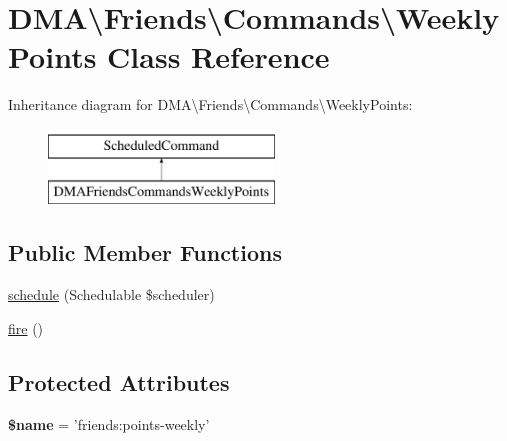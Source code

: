 \hypertarget{classDMA_1_1Friends_1_1Commands_1_1WeeklyPoints}{\section{D\+M\+A\textbackslash{}Friends\textbackslash{}Commands\textbackslash{}Weekly\+Points Class Reference}
\label{classDMA_1_1Friends_1_1Commands_1_1WeeklyPoints}
}
Inheritance diagram for D\+M\+A\textbackslash{}Friends\textbackslash{}Commands\textbackslash{}Weekly\+Points\+:\begin{figure}[H]
\begin{center}
\leavevmode
\includegraphics[height=2.000000cm]{d5/d03/classDMA_1_1Friends_1_1Commands_1_1WeeklyPoints}
\end{center}
\end{figure}
\subsection*{Public Member Functions}
\begin{DoxyCompactItemize}
\item 
\hyperlink{classDMA_1_1Friends_1_1Commands_1_1WeeklyPoints_a3610e0fd1a7e2e91dd70a05bfb7f94e8}{schedule} (Schedulable \$scheduler)
\item 
\hyperlink{classDMA_1_1Friends_1_1Commands_1_1WeeklyPoints_a3fb80cfeb37ba525e9b24e7362e35daf}{fire} ()
\end{DoxyCompactItemize}
\subsection*{Protected Attributes}
\begin{DoxyCompactItemize}
\item 
\hypertarget{classDMA_1_1Friends_1_1Commands_1_1WeeklyPoints_a246f543fbe9edae766eb00112beacf2c}{{\bfseries \$name} = 'friends\+:points-\/weekly'}\label{classDMA_1_1Friends_1_1Commands_1_1WeeklyPoints_a246f543fbe9edae766eb00112beacf2c}

\end{DoxyCompactItemize}



